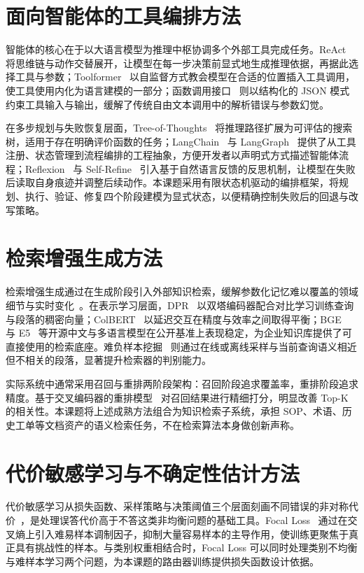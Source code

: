 \section{面向智能体的工具编排方法}

智能体的核心在于以大语言模型为推理中枢协调多个外部工具完成任务。ReAct~\cite{react} 将思维链与动作交替展开，让模型在每一步决策前显式地生成推理依据，再据此选择工具与参数；Toolformer~\cite{toolformer} 以自监督方式教会模型在合适的位置插入工具调用，使工具使用内化为语言建模的一部分；函数调用接口~\cite{functioncalling} 则以结构化的 JSON 模式约束工具输入与输出，缓解了传统自由文本调用中的解析错误与参数幻觉。

在多步规划与失败恢复层面，Tree-of-Thoughts~\cite{tot} 将推理路径扩展为可评估的搜索树，适用于存在明确评价函数的任务；LangChain~\cite{langchain} 与 LangGraph~\cite{langgraph} 提供了从工具注册、状态管理到流程编排的工程抽象，方便开发者以声明式方式描述智能体流程；Reflexion~\cite{reflexion} 与 Self-Refine~\cite{selfrefine} 引入基于自然语言反馈的反思机制，让模型在失败后读取自身痕迹并调整后续动作。本课题采用有限状态机驱动的编排框架，将规划、执行、验证、修复四个阶段建模为显式状态，以便精确控制失败后的回退与改写策略。

\section{检索增强生成方法}

检索增强生成通过在生成阶段引入外部知识检索，缓解参数化记忆难以覆盖的领域细节与实时变化~\cite{rag}。在表示学习层面，DPR~\cite{dpr} 以双塔编码器配合对比学习训练查询与段落的稠密向量；ColBERT~\cite{colbert} 以延迟交互在精度与效率之间取得平衡；BGE~\cite{bge} 与 E5~\cite{e5} 等开源中文与多语言模型在公开基准上表现稳定，为企业知识库提供了可直接使用的检索底座。难负样本挖掘~\cite{hardneg} 则通过在线或离线采样与当前查询语义相近但不相关的段落，显著提升检索器的判别能力。

实际系统中通常采用召回与重排两阶段架构：召回阶段追求覆盖率，重排阶段追求精度。基于交叉编码器的重排模型~\cite{rerank} 对召回结果进行精细打分，明显改善 Top-K 的相关性。本课题将上述成熟方法组合为知识检索子系统，承担 SOP、术语、历史工单等文档资产的语义检索任务，不在检索算法本身做创新声称。

\section{代价敏感学习与不确定性估计方法}

代价敏感学习从损失函数、采样策略与决策阈值三个层面刻画不同错误的非对称代价~\cite{costsensitive}，是处理误答代价高于不答这类非均衡问题的基础工具。Focal Loss~\cite{focalloss} 通过在交叉熵上引入难易样本调制因子，抑制大量容易样本的主导作用，使训练更聚焦于真正具有挑战性的样本。与类别权重相结合时，Focal Loss 可以同时处理类别不均衡与难样本学习两个问题，为本课题的路由器训练提供损失函数设计依据。

